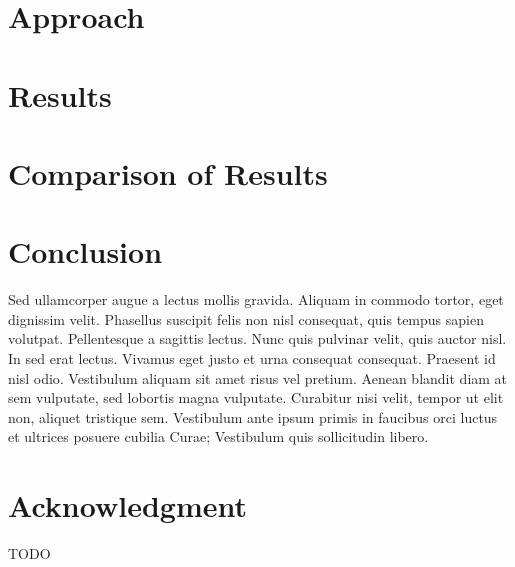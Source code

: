 \documentclass[10pt, conference]{IEEEtran}
\begin{document}
\section{Approach}
\label{sec:approach}

\section{Results}
\label{sec:results}

\section{Comparison of Results}
\label{sec:comparison-results}

\section{Conclusion}
\label{sec:conclusion}

Sed ullamcorper augue a lectus mollis gravida. Aliquam in commodo tortor, eget dignissim velit. Phasellus suscipit felis non nisl consequat, quis tempus sapien volutpat. Pellentesque a sagittis lectus. Nunc quis pulvinar velit, quis auctor nisl. In sed erat lectus. Vivamus eget justo et urna consequat consequat. Praesent id nisl odio. Vestibulum aliquam sit amet risus vel pretium. Aenean blandit diam at sem vulputate, sed lobortis magna vulputate. Curabitur nisi velit, tempor ut elit non, aliquet tristique sem. Vestibulum ante ipsum primis in faucibus orci luctus et ultrices posuere cubilia Curae; Vestibulum quis sollicitudin libero.

\section*{Acknowledgment}
TODO

\balance


\end{document}
